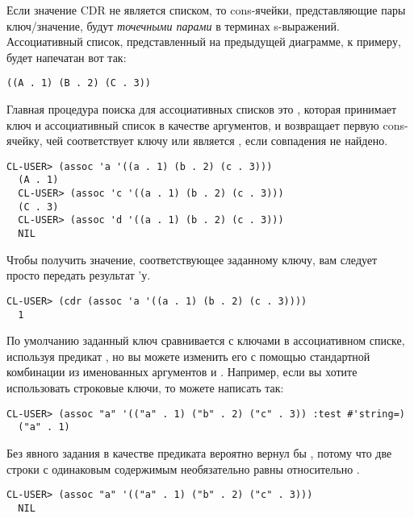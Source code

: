 Если значение CDR не является списком, то cons-ячейки, представляющие пары ключ/значение,
будут \textit{точечными парами} в терминах s-выражений. Ассоциативный список,
представленный на предыдущей диаграмме, к примеру, будет напечатан вот так:

\begin{lstlisting}[style=lisprepl]
  ((A . 1) (B . 2) (C . 3))
\end{lstlisting}

Главная процедура поиска для ассоциативных списков это , которая принимает
ключ и ассоциативный список в качестве аргументов, и возвращает первую cons-ячейку, чей
 соответствует ключу или является , если совпадения не найдено.
  
\begin{lstlisting}[style=lisprepl]
  CL-USER> (assoc 'a '((a . 1) (b . 2) (c . 3)))
  (A . 1)
  CL-USER> (assoc 'c '((a . 1) (b . 2) (c . 3)))
  (C . 3)
  CL-USER> (assoc 'd '((a . 1) (b . 2) (c . 3)))
  NIL
\end{lstlisting}

Чтобы получить значение, соответствующее заданному ключу, вам следует просто передать
результат  'у.
  
\begin{lstlisting}[style=lisprepl]
  CL-USER> (cdr (assoc 'a '((a . 1) (b . 2) (c . 3))))
  1
\end{lstlisting}

По умолчанию заданный ключ сравнивается с ключами в ассоциативном списке, используя
предикат , но вы можете изменить его с помощью стандартной комбинации из
именованных аргументов  и . Например, если вы хотите использовать
строковые ключи, то можете написать так:
  
\begin{lstlisting}[style=lisprepl]
  CL-USER> (assoc "a" '(("a" . 1) ("b" . 2) ("c" . 3)) :test #'string=)
  ("a" . 1)
\end{lstlisting}

Без явного задания в качестве  предиката   вероятно
вернул бы , потому что две строки с одинаковым содержимым необязательно равны
относительно .

\begin{lstlisting}[style=lisprepl]
  CL-USER> (assoc "a" '(("a" . 1) ("b" . 2) ("c" . 3)))
  NIL
\end{lstlisting}

